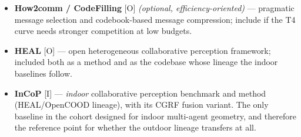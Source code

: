 \begin{itemize}
        handshake deciding \emph{when} and \emph{with whom} to communicate;
        originally multi-agent RGB-D scene understanding in simulation rather
        than automotive, which makes it one of the few non-automotive priors in
        the cohort.
  \item \textbf{How2comm / CodeFilling} \cite{how2comm,codefilling} [O]
        \emph{(optional, efficiency-oriented)} --- pragmatic message selection
        and codebook-based message compression; include if the T4 curve needs
        stronger competition at low budgets.
  \item \textbf{HEAL} \cite{heal} [O] --- open heterogeneous collaborative
        perception framework; included both as a method and as the codebase
        whose lineage the indoor baselines follow.
  \item \textbf{InCoP} \cite{incop} [I] --- \emph{indoor} collaborative
        perception benchmark and method (HEAL/OpenCOOD lineage), with its CGRF
        fusion variant. The only baseline in the cohort designed for indoor
        multi-agent geometry, and therefore the reference point for whether the
        outdoor lineage transfers at all.
\end{itemize}

